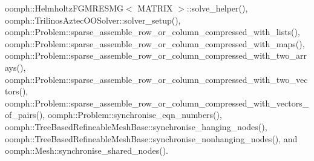 oomph\+::\+Helmholtz\+F\+G\+M\+R\+E\+S\+M\+G$<$ M\+A\+T\+R\+I\+X $>$\+::solve\+\_\+helper(), oomph\+::\+Trilinos\+Aztec\+O\+O\+Solver\+::solver\+\_\+setup(), oomph\+::\+Problem\+::sparse\+\_\+assemble\+\_\+row\+\_\+or\+\_\+column\+\_\+compressed\+\_\+with\+\_\+lists(), oomph\+::\+Problem\+::sparse\+\_\+assemble\+\_\+row\+\_\+or\+\_\+column\+\_\+compressed\+\_\+with\+\_\+maps(), oomph\+::\+Problem\+::sparse\+\_\+assemble\+\_\+row\+\_\+or\+\_\+column\+\_\+compressed\+\_\+with\+\_\+two\+\_\+arrays(), oomph\+::\+Problem\+::sparse\+\_\+assemble\+\_\+row\+\_\+or\+\_\+column\+\_\+compressed\+\_\+with\+\_\+two\+\_\+vectors(), oomph\+::\+Problem\+::sparse\+\_\+assemble\+\_\+row\+\_\+or\+\_\+column\+\_\+compressed\+\_\+with\+\_\+vectors\+\_\+of\+\_\+pairs(), oomph\+::\+Problem\+::synchronise\+\_\+eqn\+\_\+numbers(), oomph\+::\+Tree\+Based\+Refineable\+Mesh\+Base\+::synchronise\+\_\+hanging\+\_\+nodes(), oomph\+::\+Tree\+Based\+Refineable\+Mesh\+Base\+::synchronise\+\_\+nonhanging\+\_\+nodes(), and oomph\+::\+Mesh\+::synchronise\+\_\+shared\+\_\+nodes().

